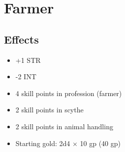 \section{Farmer}\label{background:farmer}

\subsection*{Effects}
\begin{itemize}
    \item +1 STR
    \item -2 INT
    \item 4 skill points in profession (farmer)
    \item 2 skill points in scythe
    \item 2 skill points in animal handling
    \item Starting gold: 2d4 $\times$ 10 gp (40 gp)
\end{itemize}
